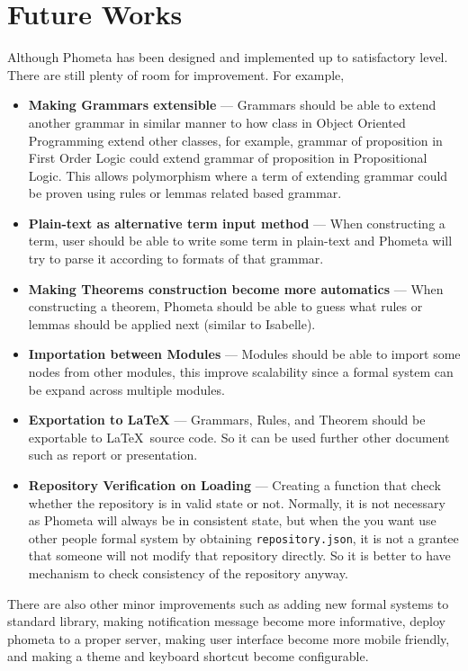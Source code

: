 \documentclass[master.tex]{subfiles}
\begin{document}
\section{Future Works}
\label{sec:future_work}

Although Phometa has been designed and implemented up to satisfactory level.
There are still plenty of room for improvement. For example,
\begin{itemize}
\item \textbf{Making Grammars extensible} --- Grammars should be able to extend another
  grammar in similar manner to how class in Object Oriented Programming extend
  other classes, for example, grammar of proposition in First Order Logic could
  extend grammar of proposition in Propositional Logic. This allows polymorphism
  where a term of extending grammar could be proven using rules or lemmas
  related based grammar.
\item \textbf{Plain-text as alternative term input method} --- When constructing a term,
  user should be able to write some term in plain-text and Phometa will try to
  parse it according to formats of that grammar.
\item \textbf{Making Theorems construction become more automatics} --- When constructing a
  theorem, Phometa should be able to guess what rules or lemmas should be
  applied next (similar to Isabelle).
\item \textbf{Importation between Modules} --- Modules should be able to import some
  nodes from other modules, this improve scalability since a formal system can
  be expand across multiple modules.
\item \textbf{Exportation to \LaTeX} --- Grammars, Rules, and Theorem should be
  exportable to \LaTeX\ source code. So it can be used further other document
  such as report or presentation.
\item \textbf{Repository Verification on Loading} --- Creating a function that check
  whether the repository is in valid state or not. Normally, it is not necessary
  as Phometa will always be in consistent state, but when the you want use other
  people formal system by obtaining \texttt{repository.json}, it is not a
  grantee that someone will not modify that repository directly. So it is better
  to have mechanism to check consistency of the repository anyway.
\end{itemize}

There are also other minor improvements such as adding new formal systems to
standard library, making notification message become more informative, deploy
phometa to a proper server, making user interface become more mobile friendly,
and making a theme and keyboard shortcut become configurable.
\end{document}
